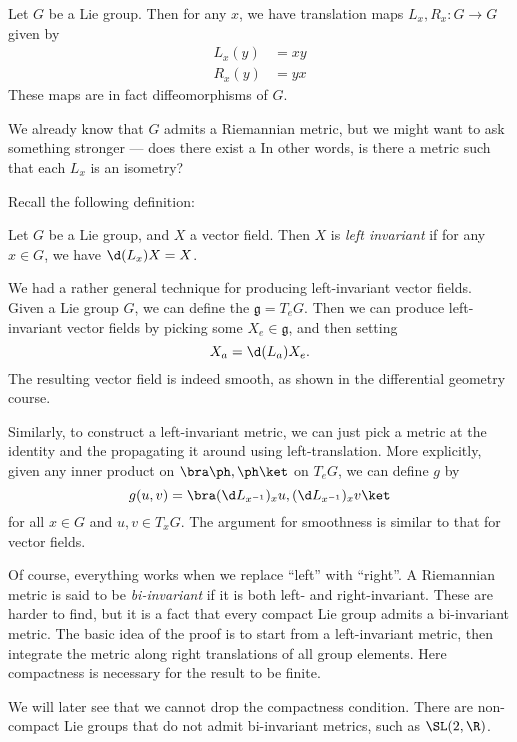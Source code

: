 \documentclass[a4paper]{article}
\begin{document}
\begin{eg}
  Let $G$ be a Lie group. Then for any $x$, we have translation maps $L_x, R_x: G \to G$ given by
  \begin{align*}
    L_x(y) &= xy\\
    R_x(y) &= yx
  \end{align*}
  These maps are in fact diffeomorphisms of $G$.

  We already know that $G$ admits a Riemannian metric, but we might want to ask something stronger --- does there exist a  In other words, is there a metric such that each $L_x$ is an isometry?

  Recall the following definition:
  \begin{defi}
    Let $G$ be a Lie group, and $X$ a vector field. Then $X$ is \emph{left invariant} if for any $x \in G$, we have $\d (L_x) X = X$.
  \end{defi}
  We had a rather general technique for producing left-invariant vector fields. Given a Lie group $G$, we can define the  $\mathfrak{g} = T_e G$. Then we can produce left-invariant vector fields by picking some $X_e \in \mathfrak{g}$, and then setting
  \[
    X_a = \d (L_a) X_e.
  \]
  The resulting vector field is indeed smooth, as shown in the differential geometry course.

  Similarly, to construct a left-invariant metric, we can just pick a metric at the identity and the propagating it around using left-translation. More explicitly, given any inner product on $\bra \ph, \ph\ket$ on $T_eG$, we can define $g$ by
  \[
    g(u, v) = \bra (\d L_{x^{-1}})_x u, (\d L_{x^{-1}})_x v\ket
  \]
  for all $x \in G$ and $u, v \in T_x G$. The argument for smoothness is similar to that for vector fields.
\end{eg}
Of course, everything works when we replace ``left'' with ``right''. A Riemannian metric is said to be \emph{bi-invariant} if it is both left- and right-invariant. These are harder to find, but it is a fact that every compact Lie group admits a bi-invariant metric. The basic idea of the proof is to start from a left-invariant metric, then integrate the metric along right translations of all group elements. Here compactness is necessary for the result to be finite.

We will later see that we cannot drop the compactness condition. There are non-compact Lie groups that do not admit bi-invariant metrics, such as $\SL(2, \R)$.
\end{document}
